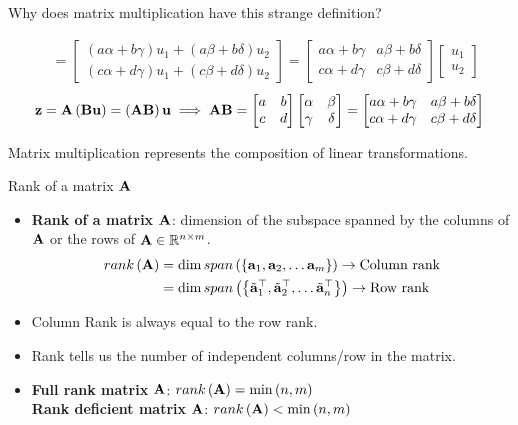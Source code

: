 \documentclass[aspectratio=169]{beamer}
\begin{document}
\begin{frame}[t]{Why does matrix multiplication have this strange definition?}
\begin{small}
\[\begin{split}
      &= \begin{bmatrix}\left(a\alpha + b\gamma\right) u_1 + \left(a\beta + b\delta\right)u_2 \\ \left(c\alpha + d\gamma\right)u_1  + \left(c\beta + d\delta\right)u_2 \end{bmatrix} = \begin{bmatrix}a\alpha + b\gamma & a\beta + b\delta \\ c\alpha + d\gamma & c\beta + d\delta \end{bmatrix} \begin{bmatrix}u_1 \\ u_2 \end{bmatrix}
    \end{split}
    \]
    \[\mathbf{z} = \mathbf{A}\left(\mathbf{B}\mathbf{u}\right) = \left(\mathbf{A}\mathbf{B}\right)\mathbf{u} \implies \mathbf{A}\mathbf{B} = \begin{bmatrix}a & b \\ c & d\end{bmatrix}\begin{bmatrix}\alpha & \beta \\ \gamma & \delta\end{bmatrix} = \begin{bmatrix}a\alpha + b\gamma & a\beta + b\delta \\ c\alpha + d\gamma & c\beta + d\delta \end{bmatrix}
    \]
  \end{small}
  Matrix multiplication represents the composition of linear transformations.
\end{frame}


\begin{frame}[t]{Rank of a matrix $\mathbf{A}$}
  \begin{itemize}
    \item \textbf{Rank of a matrix $\mathbf{A}$}: dimension of the subspace spanned by the columns of $\mathbf{A}$ or the rows of $\mathbf{A} \in \mathbb{R}^{n \times m}$. 
    \[ \begin{split} 
      rank\left( \mathbf{A} \right) &= \mathrm{dim} \, span\left( \left\{ \mathbf{a}_1, \mathbf{a}_2, \ldots \mathbf{a}_m \right\} \right) \rightarrow \text{Column rank}\\ 
      &= \mathrm{dim} \, span\left( \left\{ \tilde{\mathbf{a}}_1^\top, \tilde{\mathbf{a}}_2^\top, \ldots \tilde{\mathbf{a}}_n^\top \right\} \right) \rightarrow \text{Row rank}
    \end{split}
    \]
    
    \item Column Rank is always equal to the row rank.
    
    \item Rank tells us the number of independent columns/row in the matrix.
    
    \item \textbf{Full rank matrix } $\mathbf{A}$: $rank\left( \mathbf{A} \right)  = \min\left( n, m\right)$\\
    \textbf{Rank deficient matrix } $\mathbf{A}$: $rank\left( \mathbf{A} \right)  < \min\left( n, m\right)$
  \end{itemize}
\end{frame}
\end{document}
